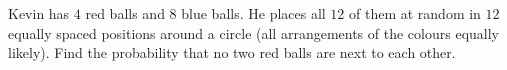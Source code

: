 Kevin has $4$ red balls and $8$ blue balls. He places all $12$ of them at random in $12$ equally spaced positions around a circle (all arrangements of the colours equally likely). Find the probability that no two red balls are next to each other.
